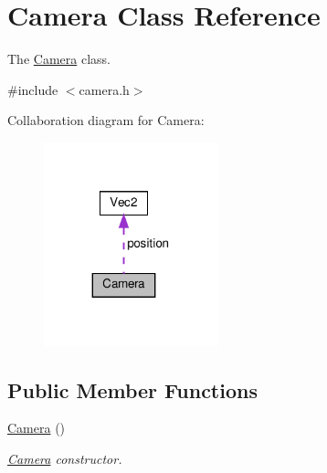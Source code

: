 \hypertarget{classCamera}{}\section{Camera Class Reference}
\label{classCamera}


The \hyperlink{classCamera}{Camera} class.  




{\ttfamily \#include $<$camera.\+h$>$}



Collaboration diagram for Camera\+:\nopagebreak
\begin{figure}[H]
\begin{center}
\leavevmode
\includegraphics[width=143pt]{classCamera__coll__graph}
\end{center}
\end{figure}
\subsection*{Public Member Functions}
\begin{DoxyCompactItemize}
\item 
\mbox{\label{classCamera_a01f94c3543f56ede7af49dc778f19331}} 
\hyperlink{classCamera_a01f94c3543f56ede7af49dc778f19331}{Camera} ()
\begin{DoxyCompactList}\small\item\em \hyperlink{classCamera}{Camera} constructor. \end{DoxyCompactList}\end{DoxyCompactItemize}

